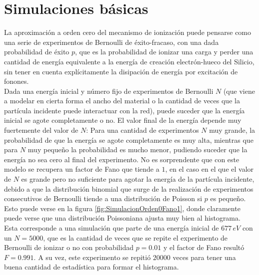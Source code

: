 \section{Simulaciones básicas}
\noindent La aproximación a orden cero del mecanismo de ionización puede pensarse como una serie de experimentos de Bernoulli de éxito-fracaso, con una dada probabilidad de éxito $p$, que es la probabilidad de ionizar una carga y perder una cantidad de energía equivalente a la energía de creación electrón-hueco del Silicio, sin tener en cuenta explícitamente la disipación de energía por excitación de fonones.\\
\indent Dada una energía inicial y número fijo de experimentos de Bernoulli $N$ (que viene a modelar en cierta forma el ancho del material o la cantidad de veces que la partícula incidente puede interactuar con la red), puede suceder que la energía inicial se agote completamente o no. El valor final de la energía depende muy fuertemente del valor de $N$: Para una cantidad de experimentos $N$ muy grande, la probabilidad de que la energía se agote completamente es muy alta, mientras que para $N$ muy pequeño la probabilidad es mucho menor, pudiendo suceder que la energía no sea cero al final del experimento. No es sorprendente que con este modelo se recupera un factor de Fano que tiende a $1$, en el caso en el que el valor de $N$ es grande pero no suficiente para agotar la energía de la partícula incidente, debido a que la distribución binomial que surge de la realización de experimentos consecutivos de Bernoulli tiende a una distribución de Poisson si $p$ es pequeño. Esto puede verse en la figura \ref{fig:SimulacionOrden0Fano1}, donde claramente puede verse que una distribución Poissoniana ajusta muy bien al histograma. Esta corresponde a una simulación que parte de una energía inicial de $677\,\si{eV}$ con un $N = 5000$, que es la cantidad de veces que se repite el experimento de Bernoulli de ionizar o no con probabilidad $p=0.01$ y el factor de Fano resultó $F = 0.991$. A su vez, este experimento se repitió $20000$ veces para tener una buena cantidad de estadística para formar el histograma.\\
